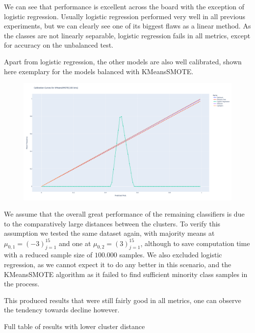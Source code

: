 We can see that performance is excellent across the board with the exception of logistic regression. 
Usually logistic regression performed very well in all previous experiments, but we can clearly see one of its biggest flaws as a linear method.
As the classes are not linearly separable, logistic regression fails in all metrics, except for accuracy on the unbalanced test.

Apart from logistic regression, the other models are also well calibrated, shown here exemplary for the models balanced with KMeansSMOTE.
\begin{figure}[H]
  	\centering
  	\includegraphics[width=0.9\linewidth]{assets/calibration_curves/Calibration_Curves_KMeansSMOTE.png}
  	\label{fig:Cal_Curves_KMeansSMOTE}
\end{figure}

We assume that the overall great performance of the remaining classifiers is due to the comparatively large distances between the clusters.
To verify this assumption we tested the same dataset again, with majority means at $\mu_{0,1} = (-3)_{j=1}^{15}$ and one at $\mu_{0,2} = (3)_{j=1}^{15}$,
although to save computation time with a reduced sample size of $100.000$ samples. 
We also excluded logistic regression, as we cannot expect it to do any better in this scenario, and the KMeansSMOTE algorithm 
as it failed to find sufficient minority class samples in the process.

This produced results that were still fairly good in all metrics, one can observe the tendency towards decline however.
\begin{table}[H]
\centering
\footnotesize
\caption{Full table of results with lower cluster distance}
\end{table}

